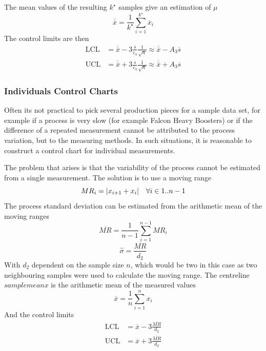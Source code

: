 \documentclass[11pt]{article}
\theoremstyle{definition}
\newcommand*\samplemean[1]{\overline{#1}}
\DeclarePairedDelimiter\abs{\lvert}{\rvert}
\begin{document}
The mean values of the resulting $k^\star$ samples give an estimation of $\mu$
\begin{equation*}
	\samplemean{\samplemean{x}} = \frac{1}{k^\star}\sum_{i=1}^{k^\star}\samplemean{x}_i
\end{equation*}
The control limits are then
\begin{align*}
	\text{LCL} &= \samplemean{\samplemean{x}} - 3 \frac{\samplemean{s}}{c_4}\frac{1}{\sqrt{n}} \approx \samplemean{\samplemean{x}} - A_3\samplemean{s}\\
	\text{UCL} &= \samplemean{\samplemean{x}} + 3 \frac{\samplemean{s}}{c_4}\frac{1}{\sqrt{n}} \approx \samplemean{\samplemean{x}} + A_3\samplemean{s}
\end{align*}

\subsubsection{Individuals Control Charts}
Often its not practical to pick several production pieces for a sample data set, for example if a process is very slow (for example Falcon Heavy Boosters) or if the difference of a repeated measurement cannot be attributed to the process variation, but to the measuring methods. In such situations, it is reasonable to construct a control chart for individual measurements.

The problem that arises is that the variability of the process cannot be estimated from a single measurement. The solution is to use a moving range
\begin{equation*}
	MR_i = \abs{x_{i+1} + x_i}\quad \forall i\in1..n-1
\end{equation*}
The process standard deviation can be estimated from the arithmetic mean of the moving ranges
\begin{equation*}
	\samplemean{MR} = \frac{1}{n-1}\sum_{i=1}^{n-1}MR_i
\end{equation*}
\begin{equation*}
	\hat{\sigma} = \frac{\samplemean{MR}}{d_2}
\end{equation*}
With $d_2$ dependent on the sample size $n$, which would be two in this case as two neighbouring samples were used to calculate the moving range.
The centreline $samplemean{x}$ is the arithmetic mean of the measured values
\begin{equation*}
	\samplemean{x} = \frac{1}{n}\sum_{i=1}^{n}x_i
\end{equation*}
And the control limits
\begin{align*}
	\text{LCL} &= \samplemean{x} - 3\frac{\samplemean{MR}}{d_2}\\
	\text{UCL} &= \samplemean{x} + 3\frac{\samplemean{MR}}{d_2}
\end{align*}
\end{document}
